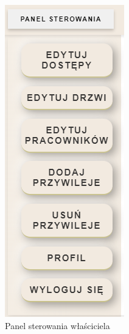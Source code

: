 \begin{figure}[h]
    \centering
    \includegraphics[scale=0.45]{photos/panel_sterowania_wlasciciela.png}
    \caption{Panel sterowania właściciela}
    \label{fig:login}
\end{figure}



